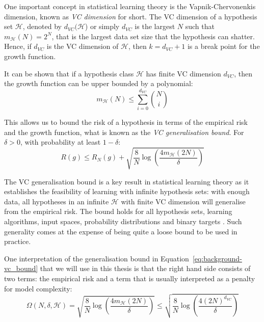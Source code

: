 {One important concept in statistical learning theory is the Vapnik-Chervonenkis dimension, known as \textit{VC dimension} for short. The VC dimension of a hypothesis set $\mathcal{H}$, denoted by $d_{VC}(\mathcal{H}$) or simply $d_{VC}$ is the largest $N$ such that $m_{\mathcal{H}}(N) = 2^N$, that is the largest data set size that the hypothesis can shatter. Hence, if $d_{VC}$ is the VC dimension of $\mathcal{H}$, then $k = d_{VC} + 1$ is a break point for the growth function.

It can be shown that if a hypothesis class $\mathcal{H}$ has finite VC dimension $d_{VC}$, then the growth function can be upper bounded by a polynomial:
%
\begin{equation}
\label{eq:background-sauer_lemma}
m_{\mathcal{H}}(N) \leq \sum_{i=0}^{d_{VC}}{\binom{N}{i}}
\end{equation}

This allows us to bound the risk of a hypothesis in terms of the empirical risk and the growth function, what is known as the \textit{VC generalisation bound}. For $\delta > 0$,  with probability at least $1 - \delta$:
%
\begin{equation}
\label{eq:background-vc_bound}
    R(g) \leq R_{N}(g) + \sqrt{\frac{8}{N}\log\left(\frac{4m_{\mathcal{H}}(2N)}{\delta}\right)}
\end{equation}

The VC generalisation bound is a key result in statistical learning theory as it establishes the feasibility of learning with infinite hypothesis sets: with enough data, all hypotheses in an infinite $\mathcal{H}$ with finite VC dimension will generalise from the empirical risk. The bound holds for all hypothesis sets, learning algorithms, input spaces, probability distributions and binary targets \citep{abu2012learningfromdata}. Such generality comes at the expense of being quite a loose bound to be used in practice.

One interpretation of the generalisation bound in Equation~\ref{eq:background-vc_bound} that we will use in this thesis is that the right hand side consists of two terms: the empirical risk and a term that is usually interpreted as a penalty for model complexity:
%
\begin{equation}
\label{eq:background-vc_model_complexity}
\Omega(N, \delta, \mathcal{H}) = \sqrt{\frac{8}{N}\log\left(\frac{4m_{\mathcal{H}}(2N)}{\delta}\right)} \leq \sqrt{\frac{8}{N}\log\left(\frac{4(2N)^{d_{VC}}}{\delta}\right)}
\end{equation}

}
